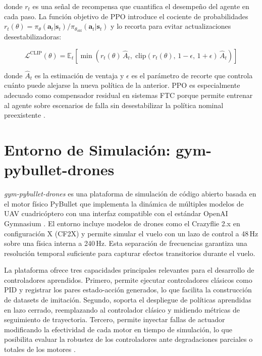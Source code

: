 \noindent donde $r_t$ es una señal de recompensa que cuantifica el desempeño del agente en cada paso. La función objetivo de PPO introduce el cociente de probabilidades $r_t(\theta) = \pi_\theta(\mathbf{a}_t|\mathbf{s}_t) / \pi_{\theta_{\text{old}}}(\mathbf{a}_t|\mathbf{s}_t)$ y lo recorta para evitar actualizaciones desestabilizadoras:

\begin{equation}
\mathcal{L}^{\text{CLIP}}(\theta) = \mathbb{E}_t\!\left[\min\!\left(r_t(\theta)\,\hat{A}_t,\; \text{clip}(r_t(\theta),\, 1-\epsilon,\, 1+\epsilon)\,\hat{A}_t\right)\right]
\end{equation}

\noindent donde $\hat{A}_t$ es la estimación de ventaja y $\epsilon$ es el parámetro de recorte que controla cuánto puede alejarse la nueva política de la anterior. PPO es especialmente adecuado como compensador residual en sistemas FTC porque permite entrenar al agente sobre escenarios de falla sin desestabilizar la política nominal preexistente \cite{liu2024}.


\section{Entorno de Simulación: gym-pybullet-drones}

\textit{gym-pybullet-drones} es una plataforma de simulación de código abierto basada en el motor físico PyBullet que implementa la dinámica de múltiples modelos de UAV cuadricóptero con una interfaz compatible con el estándar OpenAI Gymnasium \cite{zhang2023, hsu2024}. El entorno incluye modelos de drones como el Crazyflie 2.x en configuración X (CF2X) y permite simular el vuelo con un lazo de control a 48\,Hz sobre una física interna a 240\,Hz. Esta separación de frecuencias garantiza una resolución temporal suficiente para capturar efectos transitorios durante el vuelo.

La plataforma ofrece tres capacidades principales relevantes para el desarrollo de controladores aprendidos. Primero, permite ejecutar controladores clásicos como PID y registrar los pares estado-acción generados, lo que facilita la construcción de datasets de imitación. Segundo, soporta el despliegue de políticas aprendidas en lazo cerrado, reemplazando al controlador clásico y midiendo métricas de seguimiento de trayectoria. Tercero, permite inyectar fallas de actuador modificando la efectividad de cada motor en tiempo de simulación, lo que posibilita evaluar la robustez de los controladores ante degradaciones parciales o totales de los motores \cite{hsu2024}.
